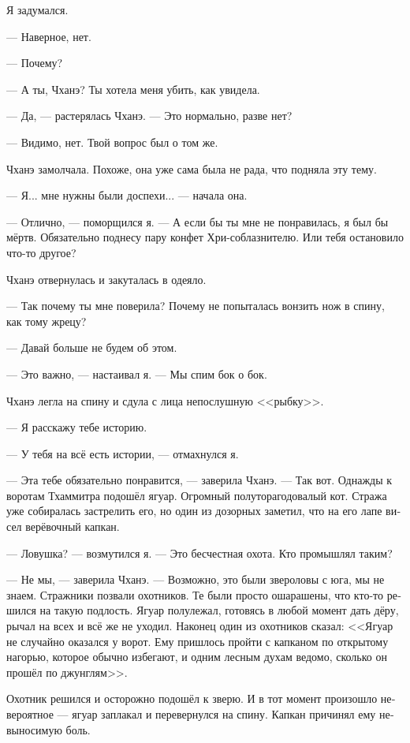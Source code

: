 \documentclass[a4paper,12pt,fleqn]{book}\usepackage{cooltooltips}\usepackage{polyglossia}\setdefaultlanguage[babelshorthands=true]{russian}\setotherlanguage{english}\defaultfontfeatures{Ligatures=TeX,Mapping=tex-text} \usepackage{xcolor}\definecolor{lightgray}{HTML}{bbbbbb}\color{lightgray}\newcommand{\ml}[3]{\textenglish{\textcolor{black}{#3}}}
\begin{document}
{Я задумался.

--- Наверное, нет.

--- Почему?

--- А ты, Чханэ?
Ты хотела меня убить, как увидела.

--- Да, --- растерялась Чханэ.
--- Это нормально, разве нет?

--- Видимо, нет.
Твой вопрос был о том же.

Чханэ замолчала.
Похоже, она уже сама была не рада, что подняла эту тему.

--- Я... мне нужны были доспехи... --- начала она.

--- Отлично, --- поморщился я.
--- А если бы ты мне не понравилась, я был бы мёртв.
Обязательно поднесу пару конфет Хри-соблазнителю.
Или тебя остановило что-то другое?

Чханэ отвернулась и закуталась в одеяло.

--- Так почему ты мне поверила?
Почему не попыталась вонзить нож в спину, как тому жрецу?

--- Давай больше не будем об этом.

--- Это важно, --- настаивал я.
--- Мы спим бок о бок.

Чханэ легла на спину и сдула с лица непослушную <<рыбку>>.

--- Я расскажу тебе историю.

--- У тебя на всё есть истории, --- отмахнулся я.

--- Эта тебе обязательно понравится, --- заверила Чханэ.
--- Так вот.
Однажды к воротам Тхаммитра подошёл ягуар.
Огромный полуторагодовалый кот.
Стража уже собиралась застрелить его, но один из дозорных заметил, что на его лапе висел верёвочный капкан.

--- Ловушка? --- возмутился я.
--- Это бесчестная охота.
Кто промышлял таким?

--- Не мы, --- заверила Чханэ.
--- Возможно, это были звероловы с юга, мы не знаем.
Стражники позвали охотников.
Те были просто ошарашены, что кто-то решился на такую подлость.
Ягуар полулежал, готовясь в любой момент дать дёру, рычал на всех и всё же не уходил.
Наконец один из охотников сказал: <<Ягуар не случайно оказался у ворот.
Ему пришлось пройти с капканом по открытому нагорью, которое обычно избегают, и одним лесным духам ведомо, сколько он прошёл по джунглям>>.

Охотник решился и осторожно подошёл к зверю.
И в тот момент произошло невероятное --- ягуар заплакал и перевернулся на спину.
Капкан причинял ему невыносимую боль.

}
\end{document}

